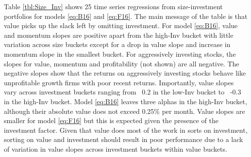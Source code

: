 
Table \ref{tbl:Size_Inv} shows 25 time series regressions from size-investment
portfolios for models \ref{eq:B16} and \ref{eq:F16}.
The main message of the table is that value picks up the slack left by
omitting investment.
For model \ref{eq:B16},
value and momentum slopes are positive apart from the high-Inv bucket
with little variation across size buckets except for a drop in value slope and
increase in momentum slope in the smallest bucket.
For aggressively investing stocks, the slopes for value, momentum and
profitability (not shown) are all negative.
The negative slopes show that the returns on aggressively investing stocks
behave like unprofitable growth firms with poor recent returns.
Importantly, value slopes vary across investment buckets ranging from ~0.2 in
the low-Inv bucket to ~-0.3 in the high-Inv bucket.
Model \ref{eq:B16} leaves three alphas in the high-Inv bucket,
although their absolute value does not exceed 0.25\% per month.
Value slopes are smaller for model \ref{eq:F16} but this is expected given the
presence of the investment factor.
Given that value does most of the work in sorts on investment, sorting on value
and investment should result in poor performance due to a lack of variation in
value slopes across investment buckets within value buckets.

